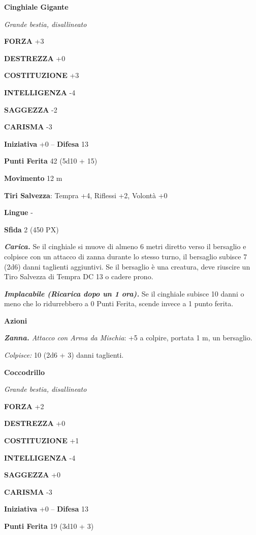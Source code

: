 \begin{multicols}{2}
	\medskip\textbf{Cinghiale Gigante}

	\textit{Grande bestia, disallineato}

	\textbf{FORZA} +3

	\textbf{DESTREZZA} +0

	\textbf{COSTITUZIONE} +3

	\textbf{INTELLIGENZA} -4

	\textbf{SAGGEZZA} -2

	\textbf{CARISMA} -3

	\textbf{Iniziativa} +0 -- \textbf{Difesa} 13

	\textbf{Punti Ferita} 42 (5d10 + 15)

	\textbf{Movimento} 12 m

	\textbf{Tiri Salvezza}: Tempra +4, Riflessi +2, Volontà +0

	\textbf{Lingue} -

	\textbf{Sfida} 2 (450 PX)

	\textit{\textbf{Carica.}} Se il cinghiale si muove di almeno 6 metri diretto verso il bersaglio e colpisce con un attacco di zanna durante lo stesso turno, il bersaglio subisce 7 (2d6) danni taglienti aggiuntivi. Se il bersaglio è una creatura, deve riuscire un Tiro Salvezza di Tempra DC 13 o cadere prono.

	\textit{\textbf{Implacabile (Ricarica dopo un 1 ora).}} Se il cinghiale subisce 10 danni o meno che lo ridurrebbero a 0 Punti Ferita, scende invece a 1 punto ferita.

	\textbf{Azioni}

	\textit{\textbf{Zanna.} Attacco con Arma da Mischia}: +5 a colpire, portata 1 m, un bersaglio.

	\textit{Colpisce:} 10 (2d6 + 3) danni taglienti.

	\medskip\textbf{Coccodrillo}

	\textit{Grande bestia, disallineato}

	\textbf{FORZA} +2

	\textbf{DESTREZZA} +0

	\textbf{COSTITUZIONE} +1

	\textbf{INTELLIGENZA} -4

	\textbf{SAGGEZZA} +0

	\textbf{CARISMA} -3

	\textbf{Iniziativa} +0 -- \textbf{Difesa} 13

	\textbf{Punti Ferita} 19 (3d10 + 3)


\end{multicols}
